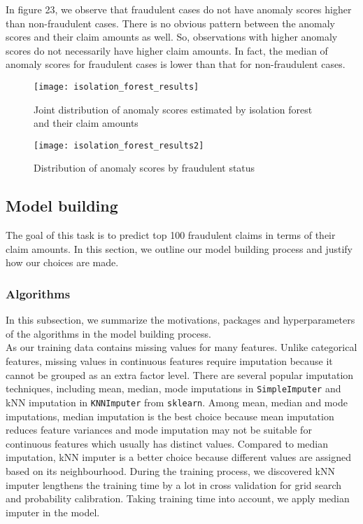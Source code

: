 \documentclass[12pt]{article}
\begin{document}
In figure 23, we observe that fraudulent cases do not have anomaly scores higher than non-fraudulent cases. There is no obvious pattern between the anomaly scores and their claim amounts as well. So, observations with higher anomaly scores do not necessarily have higher claim amounts. In fact, the median of anomaly scores for fraudulent cases is lower than that for non-fraudulent cases.

\begin{figure}[h]
\centering
\texttt{[image: isolation\_forest\_results]}
\caption{Joint distribution of anomaly scores estimated by isolation forest and their claim amounts}
\texttt{[image: isolation\_forest\_results2]}
\caption{Distribution of anomaly scores by fraudulent status}
\end{figure}

\clearpage
\subsection*{Model building}

The goal of this task is to predict top 100 fraudulent claims in terms of their claim amounts. In this section, we outline our model building process and justify how our choices are made.

\subsubsection*{Algorithms}

In this subsection, we summarize the motivations, packages and hyperparameters of the algorithms in the model building process.\\

As our training data contains missing values for many features. Unlike categorical features, missing values in continuous features require imputation because it cannot be grouped as an extra factor level. There are several popular imputation techniques, including mean, median, mode imputations in \texttt{SimpleImputer} and kNN imputation in \texttt{KNNImputer} from \texttt{sklearn}. Among mean, median and mode imputations, median imputation is the best choice because mean imputation reduces feature variances and mode imputation may not be suitable for continuous features which usually has distinct values. Compared to median imputation, kNN imputer is a better choice because different values are assigned based on its neighbourhood. During the training process, we discovered kNN imputer lengthens the training time by a lot in cross validation for grid search and probability calibration. Taking training time into account, we apply median imputer in the model.\\
\end{document}
